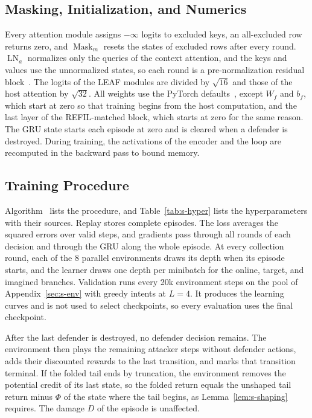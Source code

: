 \subsection{Masking, Initialization, and Numerics}
Every attention module assigns $-\infty$ logits to excluded keys, an all-excluded row returns zero, and $\operatorname{Mask}_m$ resets the states of excluded rows after every round. $\operatorname{LN}_a$ normalizes only the queries of the context attention, and the keys and values use the unnormalized states, so each round is a pre-normalization residual block~\cite{xiong2020layer,ba2016layernorm}. The logits of the LEAF modules are divided by $\sqrt{16}$ and those of the host attention by $\sqrt{32}$. All weights use the PyTorch defaults~\cite{paszke2019pytorch}, except $W_f$ and $b_f$, which start at zero so that training begins from the host computation, and the last layer of the REFIL-matched block, which starts at zero for the same reason. The GRU state starts each episode at zero and is cleared when a defender is destroyed. During training, the activations of the encoder and the loop are recomputed in the backward pass to bound memory.

\subsection{Training Procedure}
Algorithm~ lists the procedure, and Table~\ref{tab:s-hyper} lists the hyperparameters with their sources. Replay stores complete episodes. The loss  averages the squared errors over valid steps, and gradients pass through all rounds of each decision and through the GRU along the whole episode. At every collection round, each of the 8 parallel environments draws its depth when its episode starts, and the learner draws one depth per minibatch for the online, target, and imagined branches. Validation runs every 20k environment steps on the pool of Appendix~\ref{sec:s-env} with greedy intents at $L=4$. It produces the learning curves and is not used to select checkpoints, so every evaluation uses the final checkpoint.

After the last defender is destroyed, no defender decision remains. The environment then plays the remaining attacker steps without defender actions, adds their discounted rewards to the last transition, and marks that transition terminal. If the folded tail ends by truncation, the environment removes the potential credit of its last state, so the folded return equals the unshaped tail return minus $\Phi$ of the state where the tail begins, as Lemma~\ref{lem:s-shaping} requires. The damage $D$ of the episode is unaffected.

